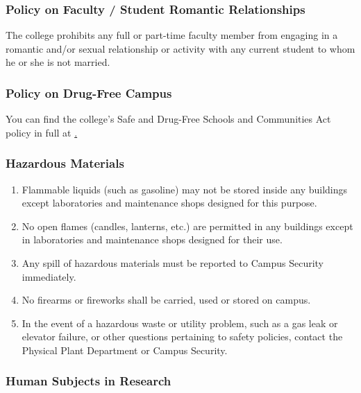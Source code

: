 		\subsubsection{Policy on Faculty / Student Romantic Relationships}
			The college prohibits any full or part-time faculty member from engaging in a romantic and/or sexual relationship or activity with any current student to whom he or she is not married.
		\subsubsection{Policy on Drug-Free Campus}
			You can find the college's Safe and Drug-Free Schools and Communities Act policy in full at
			\href{
				https://www.westmont.edu/physical-plant/campus-safety/clery-report/safe-and-drug-free-schools-and-communities-act
			
			}.
		\subsubsection{Hazardous Materials}

			\begin{enumerate}[label=\alph*)]

				\item{ Flammable liquids (such as gasoline) may not be stored inside
					any buildings except laboratories and maintenance shops designed for
					this purpose. }

				\item{ No open flames (candles, lanterns, etc.) are permitted in any
					buildings except in laboratories and maintenance shops designed for
					their use. }

				\item{ Any spill of hazardous materials must be reported to Campus
					Security immediately. }

				\item{ No firearms or fireworks shall be carried, used or stored on
					campus. }

				\item{ In the event of a hazardous waste or utility problem, such as
					a gas leak or elevator failure, or other questions pertaining to
					safety policies, contact the Physical Plant Department or Campus
					Security. }

			\end{enumerate}
		\subsubsection{Human Subjects in Research}

